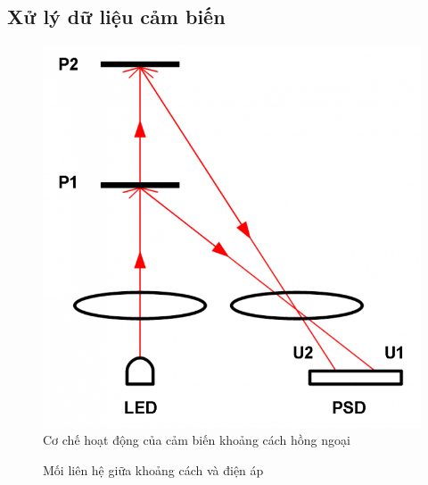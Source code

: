 \subsection{Xử lý dữ liệu cảm biến}

\begin{figure}[htbp]
    \centering
    \includegraphics[width=0.5\linewidth]{figures/sensor_ir_distance_principle.png}
    \caption{Cơ chế hoạt động của cảm biến khoảng cách hồng ngoại}
    \label{fig:sensor_ir_distance_principle}
\end{figure}

\begin{figure}[htbp]
    \centering
    \caption{Mối liên hệ giữa khoảng cách và điện áp}
    \label{fig:irSharp-vol-distance}
\end{figure}

